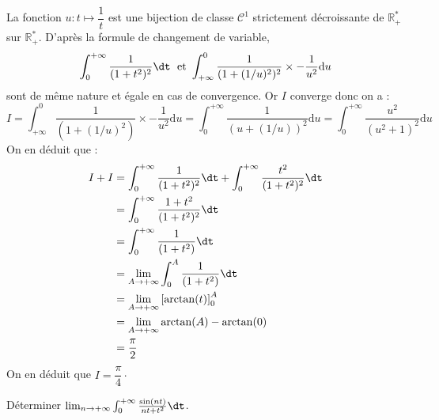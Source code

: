 \documentclass[a4paper,10pt]{report}
\begin{document}
\noindent La fonction $u : t \mapsto \dfrac{1}{t}$ est une bijection de classe $\mathcal{C}^1$ strictement décroissante de $\mathbb{R}_+^*$ sur $\mathbb{R}_+^*$. D'après la formule de changement de variable,
$$ \int_0^{+ \infty}  \frac{1}{(1 + t^{2})^{2}} \dt \; \hbox{ et } \int_{+ \infty}^0 \dfrac{1}{(1+(1/u)^2)^2} \times -\dfrac{1}{u^2} \textrm{d}u$$
sont de même nature et égale en cas de convergence. Or $I$ converge donc on a :
$$ I = \int_{+ \infty}^0 \dfrac{1}{(1+(1/u)^2)} \times -\dfrac{1}{u^2} \textrm{d}u = \int_{0}^{+ \infty} \dfrac{1}{(u+(1/u))^2}  \textrm{d}u    =    \int_{0}^{+ \infty} \dfrac{u^2}{(u^2+1)^2}  \textrm{d}u $$
On en déduit que :
\begin{align*}
I+I & = \int_0^{+ \infty}  \frac{1}{(1 + t^{2})^{2}} \dt + \int_0^{+ \infty}  \frac{t^2}{(1 + t^{2})^{2}} \dt\\
& = \int_0^{+ \infty}  \frac{1+t^2}{(1 + t^{2})^{2}} \dt \\
& = \int_0^{+ \infty}  \frac{1}{(1 + t^{2})} \dt \\
& = \lim_{A \rightarrow + \infty} \int_0^{A}  \frac{1}{(1 + t^{2})} \dt \\
& = \lim_{A \rightarrow + \infty} \left[ \arctan(t) \right]_0^A \\
& = \lim_{A \rightarrow + \infty} \arctan(A)- \arctan(0) \\
& = \dfrac{\pi}{2}
\end{align*}
On en déduit que $I = \dfrac{\pi}{4} \cdot$

\begin{Exercice}{} Déterminer $\lim_{n \to + \infty} \int_{0}^{ + \infty} \frac{\sin(nt)}{nt + t^{2}} \dt$.
\end{Exercice}
\end{document}
